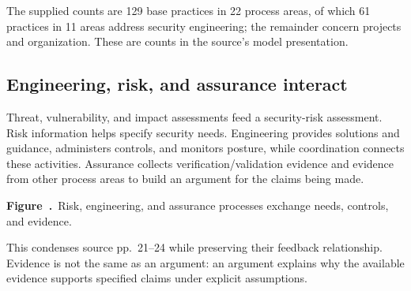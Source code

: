 \documentclass[11pt,a4paper]{article}
\numberwithin{figure}{section}
\newcommand{\diagramcaption}[1]{\par\smallskip\refstepcounter{figure}\begin{center}\small\textbf{Figure~\thefigure.}~#1\end{center}}
\begin{document}
The supplied counts are 129 base practices in 22 process areas, of which 61 practices in 11 areas address security engineering; the remainder concern projects and organization. These are counts in the source's model presentation.

\subsection{Engineering, risk, and assurance interact}
Threat, vulnerability, and impact assessments feed a security-risk assessment. Risk information helps specify security needs. Engineering provides solutions and guidance, administers controls, and monitors posture, while coordination connects these activities. Assurance collects verification/validation evidence and evidence from other process areas to build an argument for the claims being made.

\begin{center}\end{center}
\diagramcaption{Risk, engineering, and assurance processes exchange needs, controls, and evidence.}
This condenses source pp.~21--24 while preserving their feedback relationship. Evidence is not the same as an argument: an argument explains why the available evidence supports specified claims under explicit assumptions.
\end{document}
